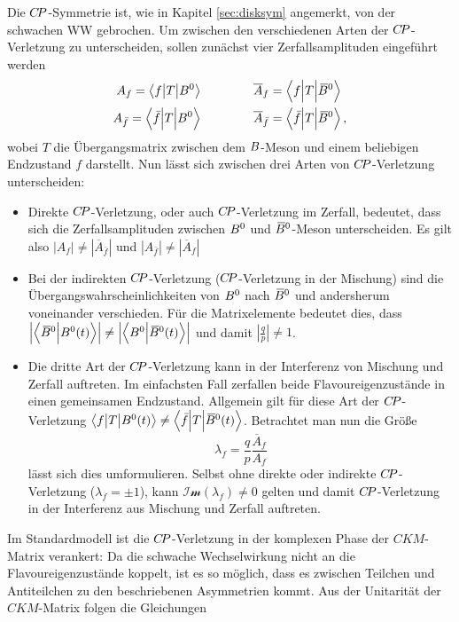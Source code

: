 Die ${C\!P}$-Symmetrie ist, wie in Kapitel \ref{sec:disksym} angemerkt, von der schwachen WW gebrochen. Um zwischen den verschiedenen Arten der ${C\!P}$-Verletzung zu unterscheiden, sollen zunächst vier Zerfallsamplituden eingeführt werden
\begin{equation}
\begin{split}
A_f=\left<f\big|T\big|{{B}^0}\right>&\hspace{1.5cm}\overline{A}_f=\left<f\Big|T\Big|{{\kern 0.18em\overline{\kern -0.18em B}{}}{}^0}\right>\\
A_{\bar{f}}=\left<\bar{f}\Big|T\Big|{{B}^0}\right>&\hspace{1.5cm}\overline{A}_{\bar{f}}=\left<\bar{f}\Big|T\Big|{{\kern 0.18em\overline{\kern -0.18em B}{}}{}^0}\right>,
\end{split}
\end{equation}
wobei $T$ die Übergangsmatrix zwischen dem ${B}$-Meson und einem beliebigen Endzustand $f$ darstellt. Nun lässt sich zwischen drei Arten von ${C\!P}$-Verletzung unterscheiden:
\begin{itemize}
\item Direkte ${C\!P}$-Verletzung, oder auch ${C\!P}$-Verletzung im Zerfall, bedeutet, dass sich die Zerfallsamplituden zwischen ${{B}^0}$ und ${{\kern 0.18em\overline{\kern -0.18em B}{}}{}^0}$-Meson unterscheiden. Es gilt also $\left|A_f\right|\neq\left|\overline{A}_{\bar{f}}\right|$ und $\left|A_{\bar{f}}\right|\neq\left|\overline{A}_f\right|$
\item Bei der indirekten ${C\!P}$-Verletzung (${C\!P}$-Verletzung in der Mischung) sind die Übergangswahrscheinlichkeiten von ${{B}^0}$ nach ${{\kern 0.18em\overline{\kern -0.18em B}{}}{}^0}$ und andersherum voneinander verschieden. Für die Matrixelemente bedeutet dies, dass $\left|\left<{{\kern 0.18em\overline{\kern -0.18em B}{}}{}^0}\Big|{{B}^0}(t)\right>\right|\neq\left|\left<{{B}^0}\Big|{{\kern 0.18em\overline{\kern -0.18em B}{}}{}^0}(t)\right>\right|$ und damit $\left|\tfrac{q}{p}\right|\neq1$. 
\item Die dritte Art der ${C\!P}$-Verletzung kann in der Interferenz von Mischung und Zerfall auftreten. Im einfachsten Fall zerfallen beide Flavoureigenzustände in einen gemeinsamen Endzustand. Allgemein gilt für diese Art der ${C\!P}$-Verletzung $\left<f\big|T\big|{{B}^0}(t)\right>\neq\left<\bar{f}\Big|T\Big|{{\kern 0.18em\overline{\kern -0.18em B}{}}{}^0}(t)\right>$. Betrachtet man nun die Größe
\begin{equation}
\lambda_f=\frac{q}{p}\frac{\overline{A}_f}{A_f}
\end{equation}
lässt sich dies umformulieren. Selbst ohne direkte oder indirekte ${C\!P}$-Verletzung ($\lambda_f=\pm1$), kann $\mathcal{Im}(\lambda_f)\neq0$ gelten und damit ${C\!P}$-Verletzung in der Interferenz aus Mischung und Zerfall auftreten. 
\end{itemize}
Im Standardmodell ist die ${C\!P}$-Verletzung in der komplexen Phase der $C\!K\!M$-Matrix verankert: Da die schwache Wechselwirkung nicht an die Flavoureigenzustände koppelt, ist es so möglich, dass es zwischen Teilchen und Antiteilchen zu den beschriebenen Asymmetrien kommt. Aus der Unitarität der $C\!K\!M$-Matrix folgen die Gleichungen 

